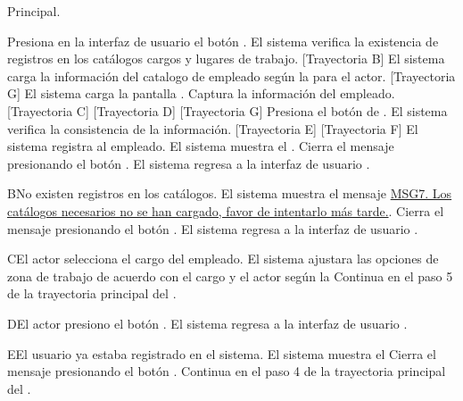 \begin{UCtrayectoria}{Principal.}
    
  \UCpaso[\UCactor] Presiona en la interfaz de usuario  el botón \IUbutton{+}.
    \UCpaso  El sistema verifica la existencia de registros en los catálogos cargos  y  lugares de trabajo. [Trayectoria B] 
    \UCpaso El sistema carga la información del catalogo de empleado  según la  para el actor. [Trayectoria G]
    \UCpaso El sistema carga la pantalla  .    \UCpaso[\UCactor] Captura la información del empleado.[Trayectoria C] [Trayectoria D] [Trayectoria G]
    \UCpaso[\UCactor]  Presiona el botón de .
    \UCpaso El sistema verifica la consistencia de la información. [Trayectoria E] [Trayectoria F]
    \UCpaso El sistema registra al empleado.
    \UCpaso  El sistema muestra el .    
    \UCpaso[\UCactor] Cierra el mensaje presionando el botón .
    \UCpaso El sistema regresa a la interfaz de usuario .
\end{UCtrayectoria}


\begin{UCtrayectoriaA}{B}{No existen registros en los catálogos.}
    \UCpaso El sistema muestra el mensaje \hyperref[MSG7]{MSG7. Los catálogos necesarios no se han cargado, favor de intentarlo más tarde.}.
	\UCpaso[\UCactor] Cierra el mensaje presionando el botón .
     \UCpaso El sistema regresa a la interfaz de usuario .
\end{UCtrayectoriaA}

\begin{UCtrayectoriaA}{C}{El actor selecciona el cargo del empleado.}
    \UCpaso     El sistema ajustara las opciones de zona de trabajo de acuerdo con el cargo y el actor según la 
    \UCpaso Continua en el paso 5 de la trayectoria principal del .
\end{UCtrayectoriaA}

\begin{UCtrayectoriaA}{D}{El actor presiono el botón .}
 \UCpaso El sistema regresa a la interfaz de usuario .
\end{UCtrayectoriaA}

\begin{UCtrayectoriaA}{E}{El usuario ya estaba registrado en el sistema.}
 \UCpaso El sistema muestra el  
 \UCpaso[\UCactor] Cierra el mensaje presionando el botón .
 \UCpaso Continua en el paso 4 de la trayectoria principal del .
\end{UCtrayectoriaA}

